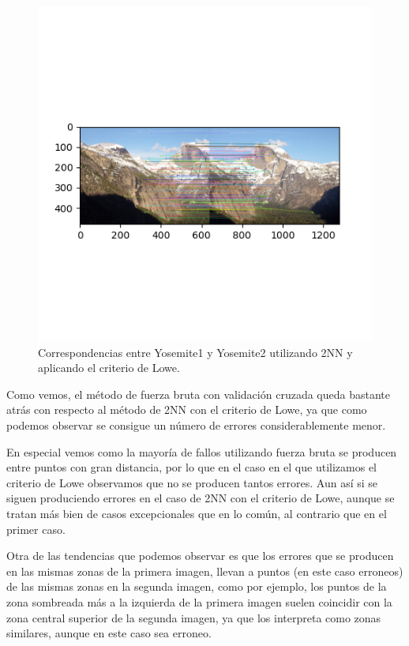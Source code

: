 \documentclass[12pt, spanish]{article}
\begin{document}
\begin{figure}[H]
  \centering
      \includegraphics[width=\textwidth]{correspondencias_lowe_2nn.png}
 		\caption{Correspondencias entre Yosemite1 y Yosemite2 utilizando 2NN y aplicando el criterio de Lowe.}
\end{figure}


Como vemos, el método de fuerza bruta con validación cruzada queda bastante atrás con respecto al método de 2NN con el criterio de Lowe, ya que como podemos observar se consigue un número de errores considerablemente menor.

En especial vemos como la mayoría de fallos utilizando fuerza bruta se producen entre puntos con gran distancia, por lo que en el caso en el que utilizamos el criterio de Lowe observamos que no se producen tantos errores. Aun así si se siguen produciendo errores en el caso de 2NN con el criterio de Lowe, aunque se tratan más bien de casos excepcionales que en lo común, al contrario que en el primer caso.

Otra de las tendencias que podemos observar es que los errores que se producen en las mismas zonas de la primera imagen, llevan a puntos (en este caso erroneos) de las mismas zonas en la segunda imagen, como por ejemplo, los puntos de la zona sombreada más a la izquierda de la primera imagen suelen coincidir con la zona central superior de la segunda imagen, ya que los interpreta como zonas similares, aunque en este caso sea erroneo.
\end{document}
